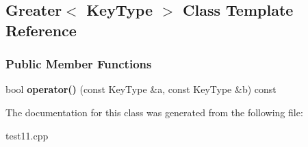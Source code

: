 \hypertarget{class_greater}{}\subsection{Greater$<$ Key\+Type $>$ Class Template Reference}
\label{class_greater}
\subsubsection*{Public Member Functions}
\begin{DoxyCompactItemize}
\item 
bool {\bfseries operator()} (const Key\+Type \&a, const Key\+Type \&b) const \hypertarget{class_greater_a79d9cb7121723ee9d65b11cb2fce0379}{}\label{class_greater_a79d9cb7121723ee9d65b11cb2fce0379}

\end{DoxyCompactItemize}


The documentation for this class was generated from the following file\+:\begin{DoxyCompactItemize}
\item 
test11.\+cpp\end{DoxyCompactItemize}

